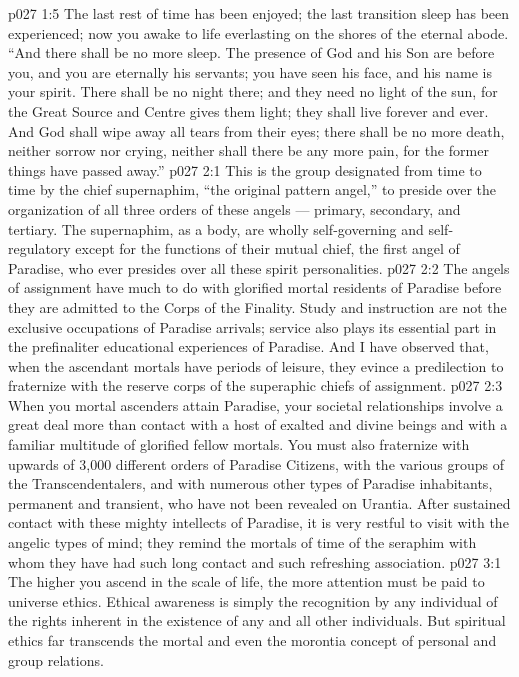 \vs p027 1:5 The last rest of time has been enjoyed; the last transition sleep has been experienced; now you awake to life everlasting on the shores of the eternal abode. “And there shall be no more sleep. The presence of God and his Son are before you, and you are eternally his servants; you have seen his face, and his name is your spirit. There shall be no night there; and they need no light of the sun, for the Great Source and Centre gives them light; they shall live forever and ever. And God shall wipe away all tears from their eyes; there shall be no more death, neither sorrow nor crying, neither shall there be any more pain, for the former things have passed away.”
\vs p027 2:1 This is the group designated from time to time by the chief supernaphim, “the original pattern angel,” to preside over the organization of all three orders of these angels --- primary, secondary, and tertiary. The supernaphim, as a body, are wholly self\hyp{}governing and self\hyp{}regulatory except for the functions of their mutual chief, the first angel of Paradise, who ever presides over all these spirit personalities.
\vs p027 2:2 The angels of assignment have much to do with glorified mortal residents of Paradise before they are admitted to the Corps of the Finality. Study and instruction are not the exclusive occupations of Paradise arrivals; service also plays its essential part in the prefinaliter educational experiences of Paradise. And I have observed that, when the ascendant mortals have periods of leisure, they evince a predilection to fraternize with the reserve corps of the superaphic chiefs of assignment.
\vs p027 2:3 When you mortal ascenders attain Paradise, your societal relationships involve a great deal more than contact with a host of exalted and divine beings and with a familiar multitude of glorified fellow mortals. You must also fraternize with upwards of 3,000 different orders of Paradise Citizens, with the various groups of the Transcendentalers, and with numerous other types of Paradise inhabitants, permanent and transient, who have not been revealed on Urantia. After sustained contact with these mighty intellects of Paradise, it is very restful to visit with the angelic types of mind; they remind the mortals of time of the seraphim with whom they have had such long contact and such refreshing association.
\vs p027 3:1 The higher you ascend in the scale of life, the more attention must be paid to universe ethics. Ethical awareness is simply the recognition by any individual of the rights inherent in the existence of any and all other individuals. But spiritual ethics far transcends the mortal and even the morontia concept of personal and group relations.
